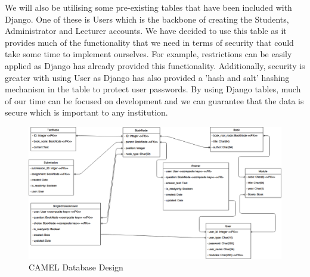 	We will also be utilising some pre-existing tables that have been included with Django. One of these is Users which is the backbone of creating the Students, Administrator and Lecturer accounts. We have decided to use this table as it provides much of the functionality that we need in terms of security that could take some time to implement ourselves. For example, restrictions can be easily applied as Django has already provided this functionality. Additionally, security is greater with using User as Django has also provided a 'hash and salt' hashing mechanism in the table to protect user passwords. By using Django tables, much of our time can be focused on development and we can guarantee that the data is secure which is important to any institution.\\	
	
	\begin{figure}[h]
		\includegraphics[scale=0.45]{implementation/img/database_design}
		\caption{CAMEL Database Design}
	\end{figure}